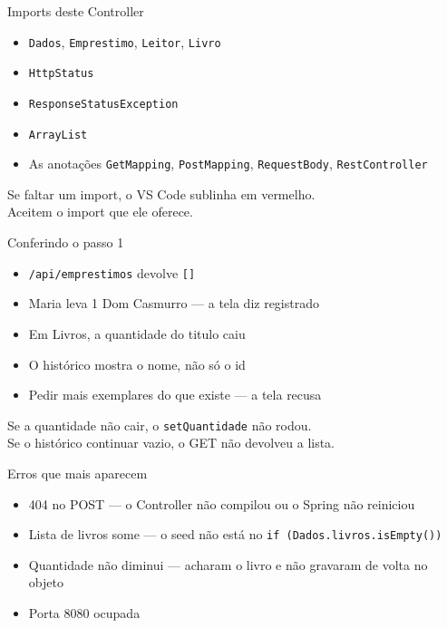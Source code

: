 \documentclass[aspectratio=169,11pt]{beamer}
\begin{document}
\begin{frame}{Imports deste Controller}
  \begin{itemize}
    \item \texttt{Dados}, \texttt{Emprestimo}, \texttt{Leitor}, \texttt{Livro}
    \item \texttt{HttpStatus}
    \item \texttt{ResponseStatusException}
    \item \texttt{ArrayList}
    \item As anotações \texttt{GetMapping}, \texttt{PostMapping},
          \texttt{RequestBody}, \texttt{RestController}
  \end{itemize}

  \vspace{0.5em}
  Se faltar um import, o VS Code sublinha em vermelho.\\
  Aceitem o import que ele oferece.
\end{frame}

\begin{frame}{Conferindo o passo 1}
  \begin{itemize}
    \item [ ] \texttt{/api/emprestimos} devolve \texttt{[]}
    \item [ ] Maria leva 1 Dom Casmurro --- a tela diz registrado
    \item [ ] Em Livros, a quantidade do titulo caiu
    \item [ ] O histórico mostra o nome, não só o id
    \item [ ] Pedir mais exemplares do que existe --- a tela recusa
  \end{itemize}

  \vspace{0.5em}
  Se a quantidade não cair, o \texttt{setQuantidade} não rodou.\\
  Se o histórico continuar vazio, o GET não devolveu a lista.
\end{frame}

\begin{frame}{Erros que mais aparecem}
  \begin{itemize}
    \item 404 no POST --- o Controller não compilou ou o Spring
          não reiniciou
    \item Lista de livros some --- o seed não está no
          \texttt{if (Dados.livros.isEmpty())}
    \item Quantidade não diminui --- acharam o livro e não
          gravaram de volta no objeto
    \item Porta 8080 ocupada
  \end{itemize}
\end{frame}
\end{document}
